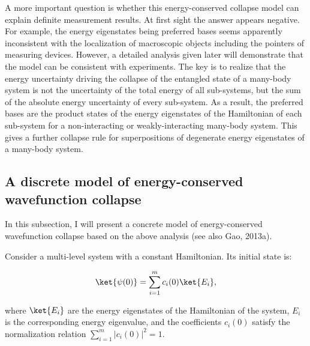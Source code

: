 A more important question is whether this energy-conserved collapse model can explain definite measurement results. At first sight the answer appears negative. For example, the energy eigenstates being preferred bases seems apparently inconsistent with the localization of macroscopic objects including the pointers of measuring devices. However, a detailed analysis given later will demonstrate that the model can be consistent with experiments. The key is to realize that the energy uncertainty driving the collapse of the entangled state of a many-body system is not the uncertainty of the total energy of all sub-systems, but the sum of the absolute energy uncertainty of every sub-system. As a result, the preferred bases are the product states of the energy eigenstates of the Hamiltonian of each sub-system for a non-interacting or weakly-interacting many-body system. This gives a further collapse rule for superpositions of degenerate energy eigenstates of a many-body system.

\subsection{A discrete model of energy-conserved wavefunction collapse}

In this subsection, I will present a concrete model of energy-conserved wavefunction collapse based on the above analysis (see also Gao, 2013a).

Consider a multi-level system with a constant Hamiltonian. Its initial state is:  

\begin{equation}
\ket{\psi(0)}=\sum_{i=1}^m{c_i(0) \ket{E_i}},
\label{}
\end{equation}

\noindent  where $\ket{E_i}$ are the energy eigenstates of the Hamiltonian of the system, $E_i$ is the corresponding energy eigenvalue, and the coefficients $c_i(0)$ satisfy the normalization relation $\sum_{i=1}^m{|c_i(0)|^2}=1$. 

